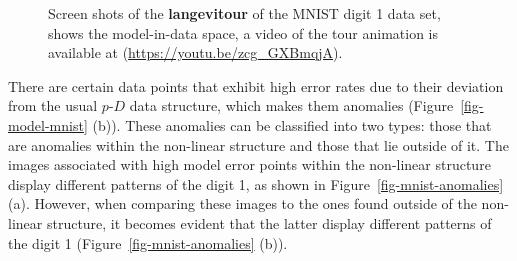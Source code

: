 \documentclass[
  12pt]{article}
\newcommand\pD{$p\text{-}D$}
\begin{document}
\begin{figure}[H]
\begin{minipage}{0.33\linewidth}
{}

\subcaption{\label{fig-mnist1-sc2}}

\end{minipage}%
%
\begin{minipage}{0.33\linewidth}


\subcaption{\label{fig-mnist1-sc3}}

\end{minipage}%

\caption{\label{fig-mnist1-sc}Screen shots of the \textbf{langevitour}
of the MNIST digit 1 data set, shows the model-in-data space, a video of
the tour animation is available at
(\url{https://youtu.be/zcg_GXBmqjA}).}

\end{figure}%

There are certain data points that exhibit high error rates due to their
deviation from the usual \pD{} data structure, which makes them
anomalies (Figure~\ref{fig-model-mnist} (b)). These anomalies can be
classified into two types: those that are anomalies within the
non-linear structure and those that lie outside of it. The images
associated with high model error points within the non-linear structure
display different patterns of the digit 1, as shown in
Figure~\ref{fig-mnist-anomalies} (a). However, when comparing these
images to the ones found outside of the non-linear structure, it becomes
evident that the latter display different patterns of the digit 1
(Figure~\ref{fig-mnist-anomalies} (b)).
\end{document}
